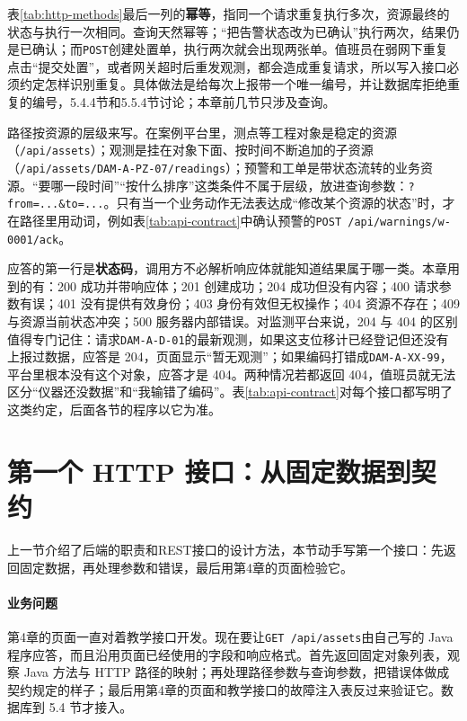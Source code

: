 表\ref{tab:http-methods}最后一列的\textbf{幂等}，指同一个请求重复执行多次，资源最终的状态与执行一次相同。查询天然幂等；“把告警状态改为已确认”执行两次，结果仍是已确认；而\texttt{POST}创建处置单，执行两次就会出现两张单。值班员在弱网下重复点击“提交处置”，或者网关超时后重发观测，都会造成重复请求，所以写入接口必须约定怎样识别重复。具体做法是给每次上报带一个唯一编号，并让数据库拒绝重复的编号，5.4.4节和5.5.4节讨论；本章前几节只涉及查询。

路径按资源的层级来写。在案例平台里，测点等工程对象是稳定的资源（\texttt{/api/assets}）；观测是挂在对象下面、按时间不断追加的子资源（\texttt{/api/assets/DAM-A-PZ-07/readings}）；预警和工单是带状态流转的业务资源。“要哪一段时间”“按什么排序”这类条件不属于层级，放进查询参数：\texttt{?from=...\&to=...}。只有当一个业务动作无法表达成“修改某个资源的状态”时，才在路径里用动词，例如表\ref{tab:api-contract}中确认预警的\texttt{POST /api/warnings/w-0001/ack}。

应答的第一行是\textbf{状态码}，调用方不必解析响应体就能知道结果属于哪一类。本章用到的有：200 成功并带响应体；201 创建成功；204 成功但没有内容；400 请求参数有误；401 没有提供有效身份；403 身份有效但无权操作；404 资源不存在；409 与资源当前状态冲突；500 服务器内部错误。对监测平台来说，204 与 404 的区别值得专门记住：请求\texttt{DAM-A-D-01}的最新观测，如果这支位移计已经登记但还没有上报过数据，应答是 204，页面显示“暂无观测”；如果编码打错成\texttt{DAM-A-XX-99}，平台里根本没有这个对象，应答才是 404。两种情况若都返回 404，值班员就无法区分“仪器还没数据”和“我输错了编码”。表\ref{tab:api-contract}对每个接口都写明了这类约定，后面各节的程序以它为准。

\section{第一个 HTTP 接口：从固定数据到契约}\label{sec:ch05-first-api}

上一节介绍了后端的职责和REST接口的设计方法，本节动手写第一个接口：先返回固定数据，再处理参数和错误，最后用第4章的页面检验它。

\paragraph{业务问题}第4章的页面一直对着教学接口开发。现在要让\texttt{GET /api/assets}由自己写的 Java 程序应答，而且沿用页面已经使用的字段和响应格式。首先返回固定对象列表，观察 Java 方法与 HTTP 路径的映射；再处理路径参数与查询参数，把错误体做成契约规定的样子；最后用第4章的页面和教学接口的故障注入表反过来验证它。数据库到 5.4 节才接入。


